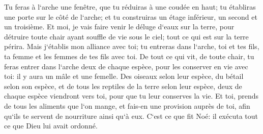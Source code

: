 \verse Tu feras à l`arche une fenêtre, que tu réduiras à une coudée en haut; tu établiras une porte sur le côté de l`arche; et tu construiras un étage inférieur, un second et un troisième. 
\verse Et moi, je vais faire venir le déluge d`eaux sur la terre, pour détruire toute chair ayant souffle de vie sous le ciel; tout ce qui est sur la terre périra. 
\verse Mais j`établis mon alliance avec toi; tu entreras dans l`arche, toi et tes fils, ta femme et les femmes de tes fils avec toi. 
\verse De tout ce qui vit, de toute chair, tu feras entrer dans l`arche deux de chaque espèce, pour les conserver en vie avec toi: il y aura un mâle et une femelle. 
\verse Des oiseaux selon leur espèce, du bétail selon son espèce, et de tous les reptiles de la terre selon leur espèce, deux de chaque espèce viendront vers toi, pour que tu leur conserves la vie. 
\verse Et toi, prends de tous les aliments que l`on mange, et fais-en une provision auprès de toi, afin qu`ils te servent de nourriture ainsi qu`à eux. 
\verse C`est ce que fit Noé: il exécuta tout ce que Dieu lui avait ordonné. 

